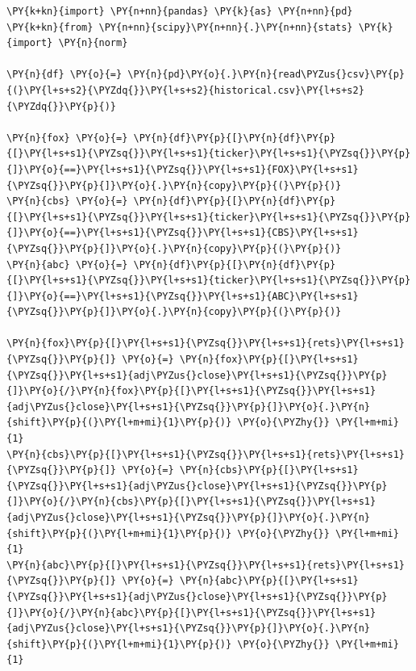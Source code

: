 \begin{Answer}
\begin{codebox}[size=fbox, boxrule=1pt, colback=cellbackground, colframe=cellborder]
\begin{Verbatim}[commandchars=\\\{\}]
\PY{k+kn}{import} \PY{n+nn}{pandas} \PY{k}{as} \PY{n+nn}{pd}
\PY{k+kn}{from} \PY{n+nn}{scipy}\PY{n+nn}{.}\PY{n+nn}{stats} \PY{k}{import} \PY{n}{norm}
		
\PY{n}{df} \PY{o}{=} \PY{n}{pd}\PY{o}{.}\PY{n}{read\PYZus{}csv}\PY{p}{(}\PY{l+s+s2}{\PYZdq{}}\PY{l+s+s2}{historical.csv}\PY{l+s+s2}{\PYZdq{}}\PY{p}{)}
		
\PY{n}{fox} \PY{o}{=} \PY{n}{df}\PY{p}{[}\PY{n}{df}\PY{p}{[}\PY{l+s+s1}{\PYZsq{}}\PY{l+s+s1}{ticker}\PY{l+s+s1}{\PYZsq{}}\PY{p}{]}\PY{o}{==}\PY{l+s+s1}{\PYZsq{}}\PY{l+s+s1}{FOX}\PY{l+s+s1}{\PYZsq{}}\PY{p}{]}\PY{o}{.}\PY{n}{copy}\PY{p}{(}\PY{p}{)}
\PY{n}{cbs} \PY{o}{=} \PY{n}{df}\PY{p}{[}\PY{n}{df}\PY{p}{[}\PY{l+s+s1}{\PYZsq{}}\PY{l+s+s1}{ticker}\PY{l+s+s1}{\PYZsq{}}\PY{p}{]}\PY{o}{==}\PY{l+s+s1}{\PYZsq{}}\PY{l+s+s1}{CBS}\PY{l+s+s1}{\PYZsq{}}\PY{p}{]}\PY{o}{.}\PY{n}{copy}\PY{p}{(}\PY{p}{)}
\PY{n}{abc} \PY{o}{=} \PY{n}{df}\PY{p}{[}\PY{n}{df}\PY{p}{[}\PY{l+s+s1}{\PYZsq{}}\PY{l+s+s1}{ticker}\PY{l+s+s1}{\PYZsq{}}\PY{p}{]}\PY{o}{==}\PY{l+s+s1}{\PYZsq{}}\PY{l+s+s1}{ABC}\PY{l+s+s1}{\PYZsq{}}\PY{p}{]}\PY{o}{.}\PY{n}{copy}\PY{p}{(}\PY{p}{)}
		
\PY{n}{fox}\PY{p}{[}\PY{l+s+s1}{\PYZsq{}}\PY{l+s+s1}{rets}\PY{l+s+s1}{\PYZsq{}}\PY{p}{]} \PY{o}{=} \PY{n}{fox}\PY{p}{[}\PY{l+s+s1}{\PYZsq{}}\PY{l+s+s1}{adj\PYZus{}close}\PY{l+s+s1}{\PYZsq{}}\PY{p}{]}\PY{o}{/}\PY{n}{fox}\PY{p}{[}\PY{l+s+s1}{\PYZsq{}}\PY{l+s+s1}{adj\PYZus{}close}\PY{l+s+s1}{\PYZsq{}}\PY{p}{]}\PY{o}{.}\PY{n}{shift}\PY{p}{(}\PY{l+m+mi}{1}\PY{p}{)} \PY{o}{\PYZhy{}} \PY{l+m+mi}{1} 
\PY{n}{cbs}\PY{p}{[}\PY{l+s+s1}{\PYZsq{}}\PY{l+s+s1}{rets}\PY{l+s+s1}{\PYZsq{}}\PY{p}{]} \PY{o}{=} \PY{n}{cbs}\PY{p}{[}\PY{l+s+s1}{\PYZsq{}}\PY{l+s+s1}{adj\PYZus{}close}\PY{l+s+s1}{\PYZsq{}}\PY{p}{]}\PY{o}{/}\PY{n}{cbs}\PY{p}{[}\PY{l+s+s1}{\PYZsq{}}\PY{l+s+s1}{adj\PYZus{}close}\PY{l+s+s1}{\PYZsq{}}\PY{p}{]}\PY{o}{.}\PY{n}{shift}\PY{p}{(}\PY{l+m+mi}{1}\PY{p}{)} \PY{o}{\PYZhy{}} \PY{l+m+mi}{1} 
\PY{n}{abc}\PY{p}{[}\PY{l+s+s1}{\PYZsq{}}\PY{l+s+s1}{rets}\PY{l+s+s1}{\PYZsq{}}\PY{p}{]} \PY{o}{=} \PY{n}{abc}\PY{p}{[}\PY{l+s+s1}{\PYZsq{}}\PY{l+s+s1}{adj\PYZus{}close}\PY{l+s+s1}{\PYZsq{}}\PY{p}{]}\PY{o}{/}\PY{n}{abc}\PY{p}{[}\PY{l+s+s1}{\PYZsq{}}\PY{l+s+s1}{adj\PYZus{}close}\PY{l+s+s1}{\PYZsq{}}\PY{p}{]}\PY{o}{.}\PY{n}{shift}\PY{p}{(}\PY{l+m+mi}{1}\PY{p}{)} \PY{o}{\PYZhy{}} \PY{l+m+mi}{1} 
		

\end{Verbatim}
\end{codebox}
\end{Answer}
